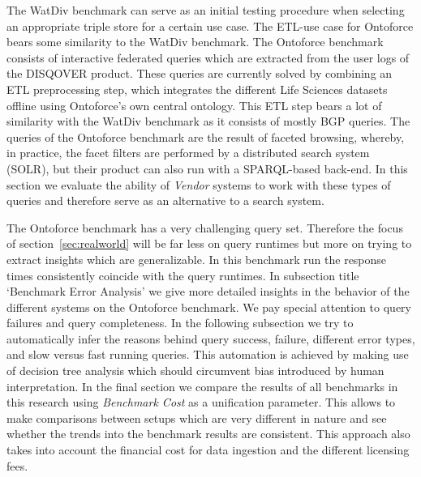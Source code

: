 

The WatDiv benchmark can serve as an initial testing procedure when selecting an appropriate triple store for a certain use case. The ETL-use case for Ontoforce bears some similarity to the WatDiv benchmark. 
The Ontoforce benchmark consists of interactive federated queries which are extracted from the user logs of the DISQOVER product. These queries are currently solved by combining an ETL preprocessing step, which integrates the different Life Sciences datasets offline using Ontoforce's own central ontology. This ETL step bears a lot of similarity with the WatDiv benchmark as it consists of mostly BGP queries. The queries of the Ontoforce benchmark are the result of faceted browsing, whereby, in practice, the facet filters are performed by a distributed search system (SOLR), but their product can also run with a SPARQL-based back-end. In this section we evaluate the ability of \emph{Vendor} systems to work with these types of queries and therefore serve as an alternative to a search system.

The Ontoforce benchmark has a very challenging query set. Therefore the focus of section~\ref{sec:realworld} will be far less on query runtimes but more on trying to extract insights which are generalizable. In this benchmark run the response times consistently coincide with the query runtimes.  
In subsection title `Benchmark Error Analysis' %
we give more detailed insights in the behavior of the different systems on the Ontoforce benchmark. We pay special attention to query failures and query completeness.
In the following subsection
we try to automatically infer the reasons behind query success, failure, different error types, and slow versus fast running queries. This automation is achieved by making use of decision tree analysis which should circumvent bias introduced by human interpretation.
In the final section we compare the results of all benchmarks in this research using \emph{Benchmark Cost} as a unification parameter. This allows to make comparisons between setups which are very different in nature and see whether the trends into the benchmark results are consistent. This approach also takes into account the financial cost for data ingestion and the different licensing fees.

